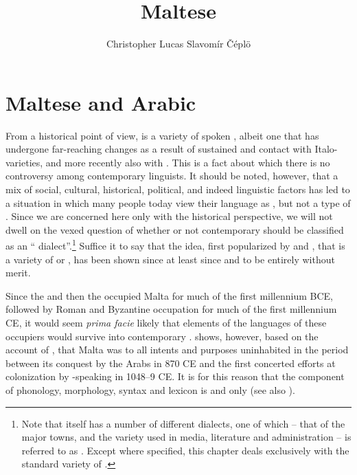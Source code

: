 \documentclass[output=paper]{langsci/langscibook}
\title{Maltese}
\author{Christopher Lucas\affiliation{SOAS University of London}\lastand
 Slavomír Čéplö\affiliation{Institute of Oriental Studies, Slovak Academy of Sciences / IMAFO Abteilung Byzanzforschung, Österreichische Akademie der Wissenschaften}
}
\begin{document}
\maketitle
\section{Maltese and Arabic} %
From a historical point of view,  is a variety of spoken , albeit one that has undergone far-reaching changes as a result of sustained and  contact with Italo- varieties, and more recently also with . This is a fact about which there is no controversy among contemporary linguists. It should be noted, however, that a mix of social, cultural, historical, political, and indeed linguistic factors has led to a situation in which many  people today view their language as , but not a type of . Since we are concerned here only with the historical perspective, we will not dwell on the vexed question of whether or not contemporary  should be classified as an `` dialect''.\footnote{Note that  itself has a number of different dialects, one of which -- that of the major towns, and the variety used in media, literature and administration -- is referred to as  . Except where specified, this chapter deals exclusively with the standard variety of .} Suffice it to say that the idea, first popularized by \cite{desoldanis1750} and \cite{vassalli1791}, that  is a variety of  or , has been shown since at least since \cite{gesenius1810} and \cite{desacy1829} to be entirely without merit.

Since the  and then the  occupied Malta for much of the first millennium BCE, followed by Roman and Byzantine occupation for much of the first millennium CE, it would seem \textit{prima facie} likely that elements of the languages of these occupiers would survive into contemporary . \cite{brincat1995} shows, however, based on the account of , that Malta was to all intents and purposes uninhabited in the period between its conquest by the Arabs in 870 CE and the first concerted efforts at colonization by -speaking  in 1048--9 CE. It is for this reason that the  component of  phonology, morphology, syntax and lexicon is  and  only (see also \citealt{grech1961}).
\end{document}

